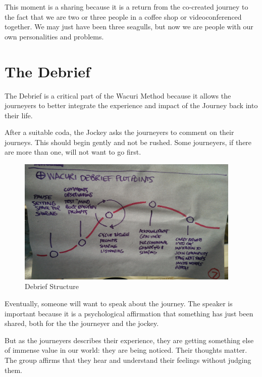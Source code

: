\documentclass[12pt]{book}
\begin{document}
This moment is a sharing because it is a return from the co-created journey to the fact that we are two or three people in a coffee shop or videoconferenced together. We may just have been three seagulls, but now we are people with our own personalities and problems.
				
			
		




\chapter{The Debrief}

The Debrief is a critical part of the Wacuri Method because it allows the journeyers to better integrate the experience and impact of the Journey back into their life.
					
After a suitable coda, the Jockey asks the journeyers to comment on their journeys. This should begin gently and not be rushed. Some journeyers, if there are more than one, will not want to go first.

\begin{figure}
  \centering
     \includegraphics[width=0.95\textwidth]{WacuriFigures/DebriefStructure.jpg}
     \caption{Debrief Structure}
  \label{fig:closeup}     
\end{figure}

Eventually, someone will want to speak about the journey. The speaker is important because it is a psychological affirmation that something has just been shared, both for the the journeyer and the jockey.
					
But as the journeyers describes their experience, they are getting something else of immense value in our world: they are being noticed. Their thoughts matter. The group affirms that they hear and understand their feelings without judging them.
					
\end{document}
